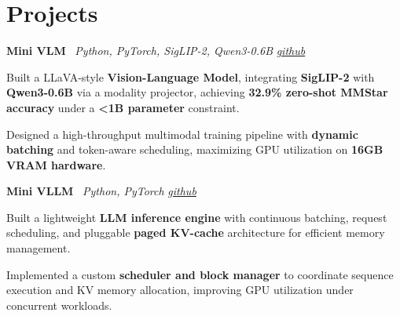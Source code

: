 \section{Projects}

    \hspace{0.5em} \textbf{Mini VLM} \textbar \  \textit{Python, PyTorch, SigLIP-2, Qwen3-0.6B}
\hfill \textit{\href{https://github.com/knarfthekant/mini_vlm}{github}}
    \vspace{0.10 cm}
    \begin{onecolentry}
        \begin{highlights}
            \item Built a LLaVA-style \textbf{Vision-Language Model}, integrating \textbf{SigLIP-2} with \textbf{Qwen3-0.6B} via a modality projector, achieving \textbf{32.9\% zero-shot MMStar accuracy} under a \textbf{<1B parameter} constraint.

            \item Designed a high-throughput multimodal training pipeline with \textbf{dynamic batching} and token-aware scheduling, maximizing GPU utilization on \textbf{16GB VRAM hardware}.

        \end{highlights}
    \end{onecolentry}
    \vspace{0.10 cm}

    \hspace{0.5em} \textbf{Mini VLLM} \textbar \  \textit{Python, PyTorch}
\hfill \textit{\href{https://github.com/knarfthekant/mini_vllm}{github}}
    \vspace{0.10 cm}
    \begin{onecolentry}
        \begin{highlights}
            \item Built a lightweight \textbf{LLM inference engine} with continuous batching, request scheduling, and pluggable \textbf{paged KV-cache} architecture for efficient memory management.

            \item Implemented a custom \textbf{scheduler and block manager} to coordinate sequence execution and KV memory allocation, improving GPU utilization under concurrent workloads.

        \end{highlights}
    \end{onecolentry}
    \vspace{0.10 cm}

